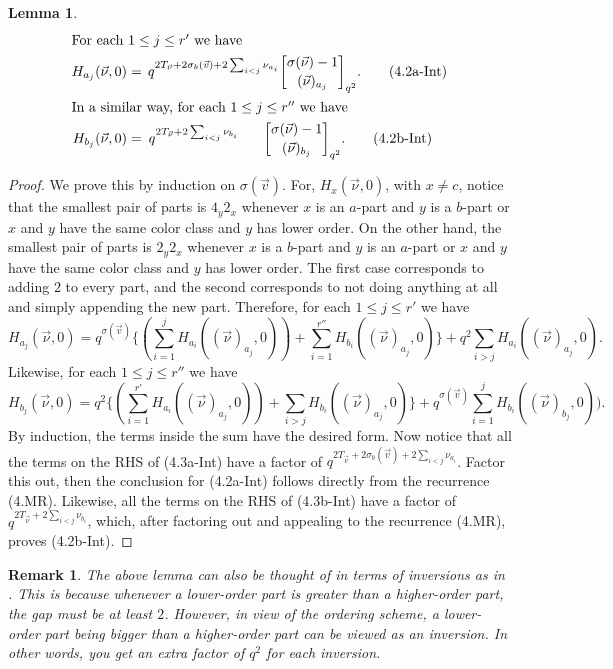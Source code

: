 \documentclass[12pt,a4paper]{amsart}
\newtheorem{remark}{Remark}
\newtheorem{lemma}{Lemma}
\theoremstyle{definition}
\theoremstyle{notation}
\theoremstyle{corollary}
\begin{document}
\begin{lemma}
\begin{align*}
\intertext{For each $1\leq j\leq r'$ we have}
    H_{a_j}(\vec{\nu},0)&=\,q^{2T_{\vec{\nu}}+2\sigma_b(\vec{v})+2\sum_{i<j}\nu_{a_i}}{\sigma(\vec{\nu})-1\brack (\vec{\nu})_{a_j}}_{q^2}.\tag{4.2a-Int}\\
\intertext{In a similar way, for each $1\leq j\leq r''$ we have}    
    H_{b_j}(\vec{\nu},0)&=\:q^{2T_{\vec{\nu}}+2\sum_{i<j}\nu_{b_i}}\:\:\:\:\:\:\:\:{\sigma(\vec{\nu})-1\brack (\vec{\nu})_{b_j}}_{q^2}.\tag{4.2b-Int}\\
\end{align*}
    
\end{lemma}
\begin{proof}
 We prove this by induction on $\sigma(\vec{v})$. For, $H_{x}(\vec{\nu},0)$, with $x\not=c$, notice that the smallest pair of parts is $4_y2_x$ whenever $x$ is an $a$-part and $y$ is a $b$-part or $x$ and $y$ have the same color class and $y$ has lower order. On the other hand, the smallest pair of parts is $2_y2_x$ whenever $x$ is a $b$-part and $y$ is an $a$-part or $x$ and $y$ have the same color class and $y$ has lower order. The first case corresponds to adding $2$ to every part, and the second corresponds to not doing anything at all and simply appending the new part. Therefore, for each $1\leq j\leq r'$ we have
    \[H_{a_j}(\vec{\nu},0)=q^{\sigma(\vec{v})}\bigg\{(\sum_{ i=1}^{j}H_{a_i}((\vec{\nu})_{a_j},0))+\sum_{i=1}^{r''}H_{b_i}((\vec{\nu})_{a_j},0)\bigg\}+q^2\sum_{ i>j}H_{a_i}((\vec{\nu})_{a_j},0)\tag{4.3a-Int}.\]
Likewise, for each $1\leq j\leq r''$ we have
    \[H_{b_j}(\vec{\nu},0)=q^2\bigg\{(\sum_{ i=1}^{r'}H_{a_i}((\vec{\nu})_{a_j},0))+\sum_{ i>j}H_{b_i}((\vec{\nu})_{a_j},0)\bigg\}+q^{\sigma(\vec{v})}\sum_{ i=1}^{j}H_{b_i}((\vec{\nu})_{b_j},0))\tag{4.3b-Int}.\]
By induction, the terms inside the sum have the desired form. Now notice that all the terms on the RHS of (4.3a-Int) have a factor of $q^{2T_{\vec{\nu}}+2\sigma_b(\vec{v})+2\sum_{i<j}\nu_{a_i}}$. Factor this out, then the conclusion for (4.2a-Int) follows directly from the recurrence (4.MR). Likewise, all the terms on the RHS of (4.3b-Int) have a factor of $q^{2T_{\vec{\nu}}+2\sum_{i<j}\nu_{b_i}}$, which, after factoring out and appealing to the recurrence (4.MR), proves (4.2b-Int).
\end{proof}
\begin{remark}
The above lemma can also be thought of in terms of inversions as in \cite[Prop.2.3]{qm}. This is because whenever a lower-order part is greater than a higher-order part, the gap must be at least $2$. However, in view of the ordering scheme, a lower-order part being bigger than a higher-order part can be viewed as an inversion. In other words, you get an extra factor of $q^2$ for each inversion.
\end{remark}
\end{document}
